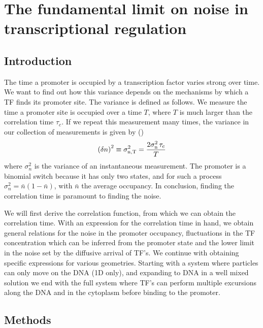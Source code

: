 \section{The fundamental limit on noise in transcriptional regulation}

\subsection{Introduction}
The time a promoter is occupied by a transcription factor varies strong over time. We want to find out how this variance depends on the mechanisms by which a TF finds its promoter site. The variance is defined as follows. We measure the time a promoter site is occupied over a time $T$, where $T$ is much larger than the correlation time $\tau_c$. If we repeat this measurement many times, the variance in our collection of measurements is given by ()
\begin{equation}
 \left( \delta n \right)^2 \equiv \sigma_{\rm n, T}^2 = \frac{2 \sigma_{\rm n}^2 \,\tau_{\rm c}}{T}
 \elabel{std_devT}
\end{equation}
where $\sigma_n^2$ is the variance of an instantaneous measurement. The promoter is a binomial switch because it has only two states, and for such a process $\sigma^2_n = \bar{n}(1-\bar{n})$, with $\bar{n}$ the average occupancy. In conclusion, finding the correlation time is paramount to finding the noise.

We will first derive the correlation function, from which we can obtain the correlation time. With an expression for the correlation time in hand, we obtain general relations for the noise in the promoter occupancy, fluctuations in the TF concentration which can be inferred from the promoter state and the lower limit in the noise set by the diffusive arrival of TF's. We continue with obtaining specific expressions for various geometries. Starting with a system where particles can only move on the DNA (1D only), and expanding to DNA in a well mixed solution we end with the full system where TF's can perform multiple excursions along the DNA and in the cytoplasm before binding to the promoter.


\subsection{Methods}

